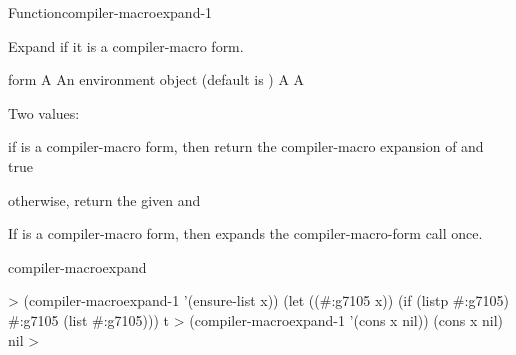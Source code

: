 \documentclass[10pt,twoside,english,pdftex]{article}
\begin{document}
\begin{functiondoc}{Function}{compiler-macroexpand-1}{ 
    }
%
%
  
\fnsyntax

\fnpurpose Expand  if it is a compiler-macro form.

\fnpackage {}

\fnmodule {}

\fnargs
\begin{args}{form}
\arg[form] A 
\arg[env] An environment object (default is \nil)
\arg[expansion] A 
\arg[expanded-p] A 
\end{args}

\fnreturns
Two values:
\begin{tightitemize}
\item if  is a compiler-macro form, then return the compiler-macro
  expansion of  and true
\item otherwise, return the given  and \nil{}
\end{tightitemize}

\fndescription 
%
If  is a compiler-macro form, then
 expands the compiler-macro-form call
once.

\begin{alsos}{compiler-macroexpand}
\end{alsos}

\fnexamples
%
\W\supp
\begin{example}
  > (compiler-macroexpand-1 '(ensure-list x))
  (let ((#:g7105 x)) (if (listp #:g7105) #:g7105 (list #:g7105)))
  t
  > (compiler-macroexpand-1 '(cons x nil))
  (cons x nil)
  nil
  >
\end{example}

\end{functiondoc}

\end{document}
